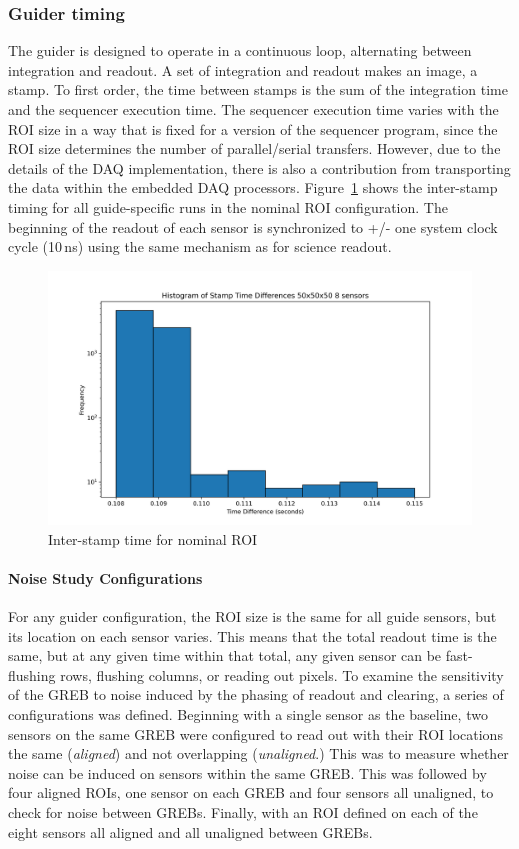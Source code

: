 \subsubsection{Guider timing}
The guider is designed to operate in a continuous loop, alternating between integration and readout. A set of integration and readout makes an image, a stamp. To first order, the time between stamps is the sum of the integration time and the sequencer execution time. The sequencer execution time varies with the ROI size in a way that is fixed for a version of the sequencer program, since the ROI size determines the number of parallel/serial transfers. However, due to the details of the DAQ implementation, there is also a contribution from transporting the data within the embedded DAQ processors. Figure~\ref{fig:guider_timing} shows the inter-stamp timing for all guide-specific runs in the nominal ROI configuration. The beginning of the readout of each sensor is synchronized to +/- one system clock cycle (10\,ns) using the same mechanism as for science readout. 

\begin{figure}[ht]
    \centering
    \includegraphics[width=0.95\linewidth]{figures/guider_timing.png}
    \caption{Inter-stamp time for nominal ROI}
    \label{fig:guider_timing}
\end{figure}

\paragraph*{Noise Study Configurations}
For any guider configuration, the ROI size is the same for all guide sensors, but its location on each sensor varies. This means that the total readout time is the same, but at any given time within that total, any given sensor can be fast-flushing rows, flushing columns, or reading out pixels. To examine the sensitivity of the GREB to noise induced by the phasing of readout and clearing, a series of configurations was defined. Beginning with a single sensor as the baseline, two sensors on the same GREB were configured to read out with their ROI locations the same (\textit{aligned}) and not overlapping (\textit{unaligned}.) This was to measure whether noise can be induced on sensors within the same GREB. This was followed by four aligned ROIs, one sensor on each GREB and four sensors all unaligned, to check for noise between GREBs. Finally, with an ROI defined on each of the eight sensors all aligned and all unaligned between GREBs.


